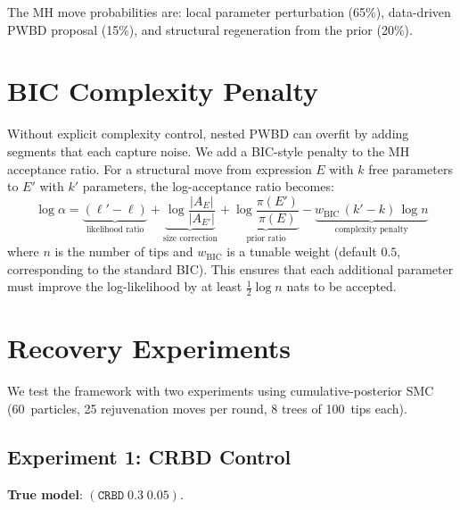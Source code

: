 \documentclass[11pt,a4paper]{article}
\begin{document}
The MH move probabilities are: local parameter perturbation (65\%),
data-driven PWBD proposal (15\%), and structural regeneration from the prior (20\%).

\section{BIC Complexity Penalty}

Without explicit complexity control, nested PWBD can overfit by adding segments that each capture noise.
We add a BIC-style penalty to the MH acceptance ratio.
For a structural move from expression $E$ with $k$ free parameters to $E'$ with $k'$ parameters,
the log-acceptance ratio becomes:
\[
  \log\alpha = \underbrace{(\ell' - \ell)}_{\text{likelihood ratio}}
             + \underbrace{\log\frac{|A_E|}{|A_{E'}|}}_{\text{size correction}}
             + \underbrace{\log\frac{\pi(E')}{\pi(E)}}_{\text{prior ratio}}
             - \underbrace{w_{\mathrm{BIC}}\,(k'-k)\,\log n}_{\text{complexity penalty}}
\]
where $n$ is the number of tips and $w_{\mathrm{BIC}}$ is a tunable weight (default $0.5$, corresponding to the standard BIC).
This ensures that each additional parameter must improve the log-likelihood by at least $\frac{1}{2}\log n$ nats to be accepted.

\section{Recovery Experiments}

We test the framework with two experiments using cumulative-posterior SMC
(60~particles, 25 rejuvenation moves per round, 8 trees of 100~tips each).

\subsection{Experiment 1: CRBD Control}

\textbf{True model}: $(\texttt{CRBD}\; 0.3\; 0.05)$.
\end{document}
